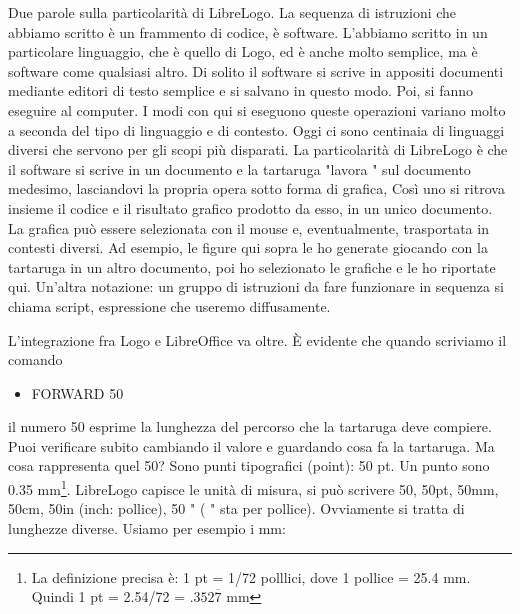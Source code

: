 Due parole sulla particolarità di LibreLogo.  La sequenza di istruzioni che abbiamo scritto è un frammento di codice, è software. L'abbiamo scritto in un particolare linguaggio, che è quello di Logo, ed è anche molto semplice, ma è software come qualsiasi altro. Di solito il software si scrive in appositi documenti mediante editori di testo semplice e si salvano in questo modo. Poi, si fanno eseguire al computer. I modi con qui si eseguono queste operazioni variano molto a seconda del tipo di linguaggio e di contesto. Oggi ci sono centinaia di linguaggi diversi che servono per gli scopi più disparati. La particolarità di LibreLogo è che il software si scrive in un documento e la tartaruga  "lavora " sul documento medesimo, lasciandovi la propria opera sotto forma di grafica, Così uno si ritrova insieme il codice e il risultato grafico prodotto da esso, in un unico documento. La grafica può essere selezionata con il mouse e, eventualmente, trasportata in contesti diversi. Ad esempio, le figure qui sopra le ho generate giocando con la tartaruga in un altro documento, poi ho selezionato le grafiche e le ho riportate qui. Un'altra notazione: un gruppo di istruzioni da fare funzionare in sequenza si chiama script, espressione che useremo diffusamente.

L'integrazione fra Logo e LibreOffice va oltre. È evidente che quando scriviamo il comando 

\vskip 1cm

\begin{scriptsize}
\begin{minipage}{1.0\textwidth}
\begin{itemize}[itemsep=-3pt,parsep=2pt]
\item[] \hspace{0.5cm} FORWARD 50  
\end{itemize}
\end{minipage}
\end{scriptsize}

\vskip 1cm

il numero 50 esprime la lunghezza del percorso che la tartaruga deve compiere. Puoi verificare subito cambiando il valore e guardando cosa fa la tartaruga. Ma cosa rappresenta quel 50?  Sono punti tipografici (point): 50 pt. Un punto sono 0.35 mm\footnote{La definizione precisa è: 1 pt = 1/72 polllici, dove 1 pollice = 25.4 mm. Quindi 1 pt = 2.54/72 = $.352\overline{7}$ mm}. LibreLogo capisce le unità di misura, si può scrivere 50, 50pt, 50mm, 50cm, 50in (inch: pollice), 50 " ( " sta per pollice). Ovviamente si tratta di lunghezze diverse. Usiamo per esempio i mm:

